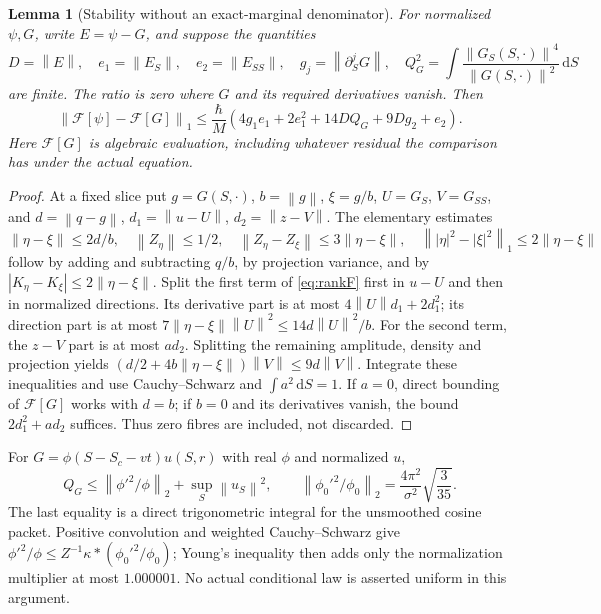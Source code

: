 \documentclass[11pt]{article}
\newtheorem{lemma}[theorem]{Lemma}
\theoremstyle{definition}\newtheorem{definition}[theorem]{Definition}
\theoremstyle{remark}\newtheorem{remark}[theorem]{Remark}
\newcommand{\norm}[1]{\left\lVert#1\right\rVert}
\newcommand{\dd}{\,\mathrm d}\newcommand{\Imv}{\operatorname{Im}}\newcommand{\ii}{\mathrm i}
\begin{document}
\begin{lemma}[Stability without an exact-marginal denominator]\label{lem:rankstable}
For normalized $\psi,G$, write $E=\psi-G$, and suppose the quantities
\[
 D=\norm E,\quad e_1=\norm{E_S},\quad e_2=\norm{E_{SS}},\quad
 g_j=\norm{\partial_S^jG},\quad
 Q_G^2=\int\frac{\norm{G_S(S,\cdot)}^4}{\norm{G(S,\cdot)}^2}\dd S
\]
are finite. The ratio is zero where $G$ and its required derivatives
vanish. Then
\begin{equation}\label{eq:rankstable}
 \norm{\mathcal F[\psi]-\mathcal F[G]}_1
 \le\frac\hbar M
 (4g_1e_1+2e_1^2+14DQ_G+9Dg_2+e_2).
\end{equation}
Here $\mathcal F[G]$ is algebraic evaluation, including whatever
residual the comparison has under the actual equation.
\end{lemma}
\begin{proof}
At a fixed slice put $g=G(S,\cdot)$, $b=\norm g$, $\xi=g/b$,
$U=G_S$, $V=G_{SS}$, and $d=\norm{q-g}$,
$d_1=\norm{u-U}$, $d_2=\norm{z-V}$. The elementary estimates
\[
 \norm{\eta-\xi}\le2d/b,\quad \norm{Z_\eta}\le1/2,
 \quad\norm{Z_\eta-Z_\xi}\le3\norm{\eta-\xi},
 \quad\norm{|\eta|^2-|\xi|^2}_1\le2\norm{\eta-\xi}
\]
follow by adding and subtracting $q/b$, by projection variance, and by
$|K_\eta-K_\xi|\le2\norm{\eta-\xi}$. Split the first term of
\eqref{eq:rankF} first in $u-U$ and then in normalized directions.
Its derivative part is at most $4\norm U d_1+2d_1^2$; its direction
part is at most $7\norm{\eta-\xi}\norm U^2\le14d\norm U^2/b$.
For the second term, the $z-V$ part is at most $ad_2$. Splitting the
remaining amplitude, density and projection yields
$(d/2+4b\norm{\eta-\xi})\norm V\le9d\norm V$.
Integrate these inequalities and use Cauchy--Schwarz and
$\int a^2\dd S=1$. If $a=0$, direct bounding of $\mathcal F[G]$
works with $d=b$; if $b=0$ and its derivatives vanish, the bound
$2d_1^2+ad_2$ suffices. Thus zero fibres are included, not discarded.
\end{proof}

For $G=\phi(S-S_c-vt)u(S,r)$ with real $\phi$ and normalized $u$,
\[
 Q_G\le\norm{\phi'^2/\phi}_2+\sup_S\norm{u_S}^2,
 \qquad
 \norm{\phi_0'^2/\phi_0}_2
  =\frac{4\pi^2}{\sigma^2}\sqrt{\frac3{35}}.
\]
The last equality is a direct trigonometric integral for the unsmoothed
cosine packet. Positive convolution and weighted Cauchy--Schwarz give
$\phi'^2/\phi\le Z^{-1}\kappa*(\phi_0'^2/\phi_0)$; Young's inequality
then adds only the normalization multiplier at most $1.000001$.
No actual conditional law is asserted uniform in this argument.
\end{document}
